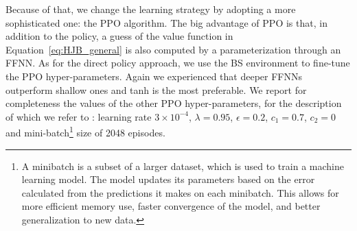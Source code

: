 \documentclass[runningheads]{m2ef}
\newcommand{\change}[1]{{\color{red} {#1}}}%
\begin{document}
Because of that, we change the learning strategy by adopting a more sophisticated one: the PPO algorithm. The big advantage of PPO is that, in addition to the policy, a guess of the value function in Equation~\eqref{eq:HJB_general} is also computed by a parameterization through an FFNN. As for the direct policy approach, we use the BS environment to fine-tune the PPO hyper-parameters. Again we experienced that deeper FFNNs outperform shallow ones and tanh is the most preferable. We report for completeness the values of the other PPO hyper-parameters, for the description of which we refer to \cite{Schulman2017}: learning rate $3\times 10^{-4}$, $\lambda=0.95$, $\epsilon=0.2$, $c_1=0.7$, $c_2=0$ and mini-batch\footnote{\change{A minibatch is a subset of a larger dataset, which is used to train a machine learning model. The model updates its parameters based on the error calculated from the predictions it makes on each minibatch. This allows for more efficient memory use, faster convergence of the model, and better generalization to new data.}} size of 2048 episodes.
\end{document}
